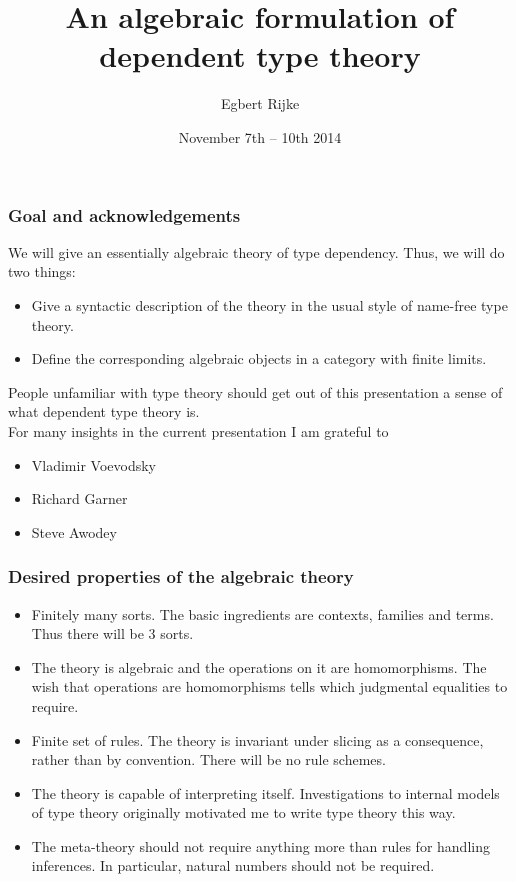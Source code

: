 \documentclass{beamer}
\title{\bf An algebraic formulation of dependent type theory}
\author{Egbert Rijke}
\institute{Carnegie Mellon University\\\texttt{erijke@andrew.cmu.edu}}
\date{November 7th -- 10th 2014}
\begin{document}
\begin{frame}
\titlepage
\end{frame}

\begin{frame}
\frametitle{\bf Goal and acknowledgements}
We will give an essentially algebraic theory of type dependency. Thus, we will
do two things:
\begin{itemize}
\item Give a syntactic description of the theory in the usual style of
name-free type theory.
\item Define the corresponding algebraic objects in a category with finite limits.
\end{itemize}
\pause
People unfamiliar with type theory should get out of this presentation 
a sense of what dependent type theory is.
\\[\baselineskip]
\pause
For many insights in the current presentation I am grateful to
\begin{itemize}
\item Vladimir Voevodsky
\item Richard Garner
\item Steve Awodey
\end{itemize}
\end{frame}

\begin{frame}
\frametitle{\bf Desired properties of the algebraic theory}
\begin{itemize}
\item Finitely many sorts. The basic ingredients are contexts, families and
terms. Thus there will be 3 sorts.
\pause
\item The theory is algebraic and the operations on it are homomorphisms. The
wish that operations are homomorphisms tells which judgmental equalities to
require.
\pause
\item Finite set of rules. The theory is invariant under slicing as a consequence, rather than by
convention. There will be no rule schemes.
\pause
\item The theory is capable of interpreting itself. Investigations to internal
models of type theory originally motivated me to write type theory this way.
\pause
\item The meta-theory should not require anything more than rules for handling
inferences. In particular, natural numbers should not be required.
\end{itemize}
\end{frame}
\end{document}
